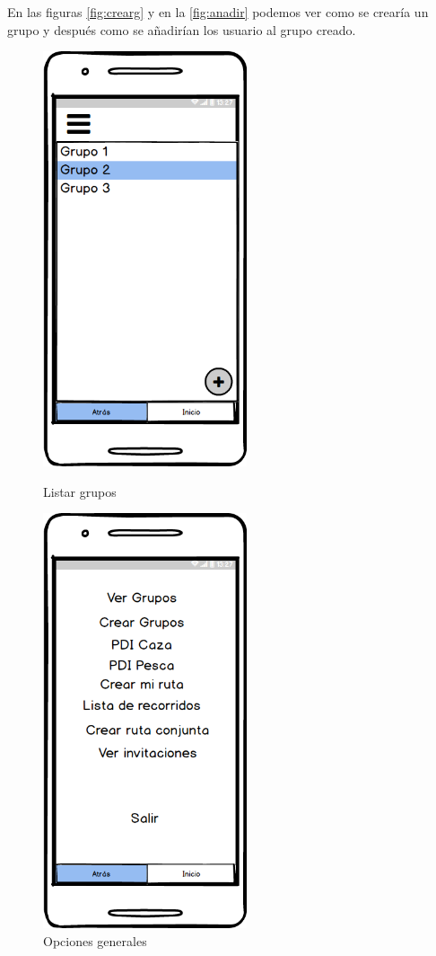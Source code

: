 En las figuras \ref{fig:crearg} y en la \ref{fig:anadir} podemos ver como se crearía un grupo y después como se añadirían los usuario al grupo creado.
	
	
	
	\begin{figure}[H]
\begin{minipage}[b]{0.5\linewidth} %
\centering
\includegraphics[width=6cm]{maqueta/lista-grupos.png}

\caption{Listar grupos}
\label{fig:verg}
\end{minipage}
\hspace{0.5cm} %
\begin{minipage}[b]{0.5\linewidth}
\centering
\includegraphics[width=6cm]{maqueta/opciones.png}
 
\caption{Opciones generales}
\label{fig:opc}
\end{minipage}
\end{figure}
	

